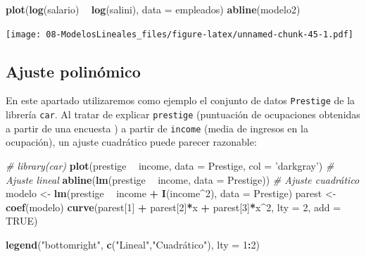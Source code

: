 \documentclass[]{book}
\newenvironment{Shaded}{\begin{snugshade}}{\end{snugshade}}
\newcommand{\KeywordTok}[1]{\textcolor[rgb]{0.13,0.29,0.53}{\textbf{#1}}}
\newcommand{\DataTypeTok}[1]{\textcolor[rgb]{0.13,0.29,0.53}{#1}}
\newcommand{\DecValTok}[1]{\textcolor[rgb]{0.00,0.00,0.81}{#1}}
\newcommand{\StringTok}[1]{\textcolor[rgb]{0.31,0.60,0.02}{#1}}
\newcommand{\CommentTok}[1]{\textcolor[rgb]{0.56,0.35,0.01}{\textit{#1}}}
\newcommand{\OtherTok}[1]{\textcolor[rgb]{0.56,0.35,0.01}{#1}}
\newcommand{\OperatorTok}[1]{\textcolor[rgb]{0.81,0.36,0.00}{\textbf{#1}}}
\newcommand{\NormalTok}[1]{#1}
\begin{document}
\begin{Shaded}
\begin{Highlighting}[]
\KeywordTok{plot}\NormalTok{(}\KeywordTok{log}\NormalTok{(salario) }\OperatorTok{~}\StringTok{ }\KeywordTok{log}\NormalTok{(salini), }\DataTypeTok{data =}\NormalTok{ empleados)}
\KeywordTok{abline}\NormalTok{(modelo2)}
\end{Highlighting}
\end{Shaded}

\texttt{[image: 08-ModelosLineales\_files/figure-latex/unnamed-chunk-45-1.pdf]}

\subsection{Ajuste polinómico}\label{ajuste-polinomico}

En este apartado utilizaremos como ejemplo el conjunto de datos
\texttt{Prestige} de la librería \texttt{car}. Al tratar de explicar
\texttt{prestige} (puntuación de ocupaciones obtenidas a partir de una
encuesta ) a partir de \texttt{income} (media de ingresos en la
ocupación), un ajuste cuadrático puede parecer razonable:

\begin{Shaded}
\begin{Highlighting}[]
\CommentTok{# library(car)}
\KeywordTok{plot}\NormalTok{(prestige }\OperatorTok{~}\StringTok{ }\NormalTok{income, }\DataTypeTok{data =}\NormalTok{ Prestige, }\DataTypeTok{col =} \StringTok{'darkgray'}\NormalTok{)}
\CommentTok{# Ajuste lineal}
\KeywordTok{abline}\NormalTok{(}\KeywordTok{lm}\NormalTok{(prestige }\OperatorTok{~}\StringTok{ }\NormalTok{income, }\DataTypeTok{data =}\NormalTok{ Prestige)) }
\CommentTok{# Ajuste cuadrático}
\NormalTok{modelo <-}\StringTok{ }\KeywordTok{lm}\NormalTok{(prestige }\OperatorTok{~}\StringTok{ }\NormalTok{income }\OperatorTok{+}\StringTok{ }\KeywordTok{I}\NormalTok{(income}\OperatorTok{^}\DecValTok{2}\NormalTok{), }\DataTypeTok{data =}\NormalTok{ Prestige)}
\NormalTok{parest <-}\StringTok{ }\KeywordTok{coef}\NormalTok{(modelo)}
\KeywordTok{curve}\NormalTok{(parest[}\DecValTok{1}\NormalTok{] }\OperatorTok{+}\StringTok{ }\NormalTok{parest[}\DecValTok{2}\NormalTok{]}\OperatorTok{*}\NormalTok{x }\OperatorTok{+}\StringTok{ }\NormalTok{parest[}\DecValTok{3}\NormalTok{]}\OperatorTok{*}\NormalTok{x}\OperatorTok{^}\DecValTok{2}\NormalTok{, }\DataTypeTok{lty =} \DecValTok{2}\NormalTok{, }\DataTypeTok{add =} \OtherTok{TRUE}\NormalTok{)}

\KeywordTok{legend}\NormalTok{(}\StringTok{"bottomright"}\NormalTok{, }\KeywordTok{c}\NormalTok{(}\StringTok{"Lineal"}\NormalTok{,}\StringTok{"Cuadrático"}\NormalTok{), }\DataTypeTok{lty =} \DecValTok{1}\OperatorTok{:}\DecValTok{2}\NormalTok{)}
\end{Highlighting}
\end{Shaded}
\end{document}
